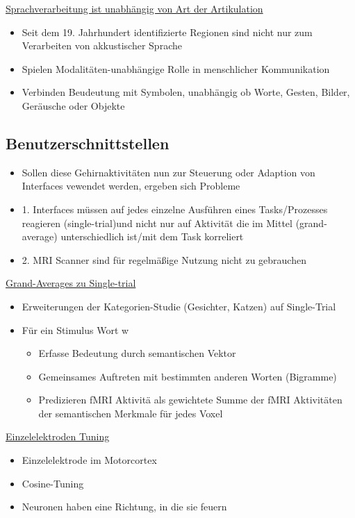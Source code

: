 \documentclass[a4paper,10pt,oneside]{article}
\begin{document}
\underline{Sprachverarbeitung ist unabhängig von Art der Artikulation} \\
	\begin{itemize}
		\item Seit dem 19. Jahrhundert identifizierte Regionen sind nicht nur zum Verarbeiten von akkustischer Sprache
		\item Spielen Modalitäten-unabhängige Rolle in menschlicher Kommunikation
		\item Verbinden Beudeutung mit Symbolen, unabhängig ob Worte, Gesten, Bilder, Geräusche oder Objekte 
	\end{itemize}
	
\subsection{Benutzerschnittstellen}
	\begin{itemize}
		\item Sollen diese Gehirnaktivitäten nun zur Steuerung oder Adaption von Interfaces vewendet werden, ergeben sich Probleme
		\item 1. Interfaces müssen auf jedes einzelne Ausführen eines Tasks/Prozesses reagieren (single-trial)und nicht nur auf Aktivität die im Mittel (grand-average) unterschiedlich ist/mit dem Task korreliert
		\item 2. MRI Scanner sind für regelmäßige Nutzung nicht zu gebrauchen
	\end{itemize}
	
\underline{Grand-Averages zu Single-trial} \\
	\begin{itemize}
		\item Erweiterungen der Kategorien-Studie (Gesichter, Katzen) auf Single-Trial
		\item Für ein Stimulus Wort w
			\begin{itemize}
				\item Erfasse Bedeutung durch semantischen Vektor
				\item Gemeinsames Auftreten mit bestimmten anderen Worten (Bigramme)
				\item Predizieren fMRI Aktivitä als gewichtete Summe der fMRI Aktivitäten der semantischen Merkmale für jedes Voxel
			\end{itemize}
	\end{itemize}

\underline{Einzelelektroden Tuning} \\
	\begin{itemize}
		\item Einzelelektrode im Motorcortex
		\item Cosine-Tuning
		\item Neuronen haben eine Richtung, in die sie feuern
	\end{itemize}
	
\end{document}
